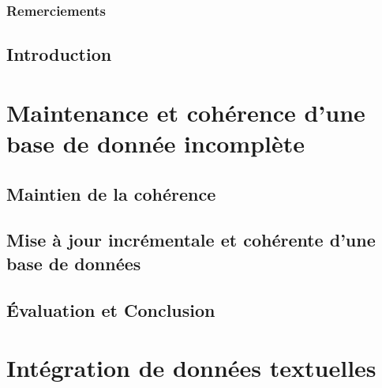 
\pagestyle{fancy}


\frontmatter
\section*{Remerciements}
\lipsum[17-19]

\newpage

\dominitoc
\tableofcontents
{}
\listoffigures
{}
\listoftables

\mainmatter

\chapter{Introduction}



\part{Maintenance et cohérence d'une base de donnée incomplète}

\chapter{Maintien de la cohérence}
\label{chp:update:intro}
\minitoc


\chapter{Mise à jour incrémentale et cohérente d'une base de données}
\label{chp:update:algos}
\minitoc


\chapter{Évaluation et Conclusion}
\label{chp:update:eval}
\minitoc



\part{Intégration de données textuelles}
\glsresetall

